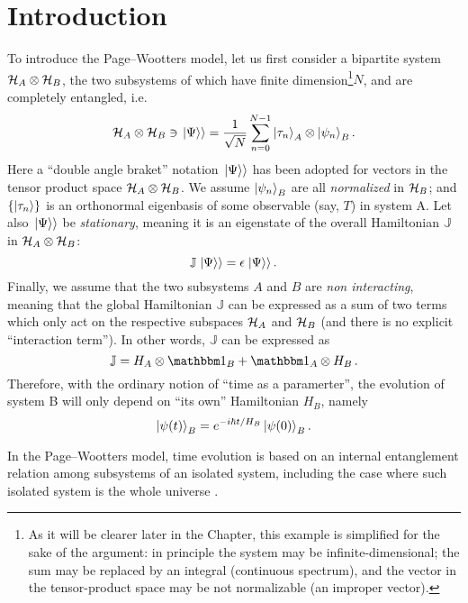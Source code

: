 \section{Introduction}

To introduce the Page--Wootters model, let us first consider
a bipartite system $\mathcal{H}_A \otimes \mathcal{H}_B$,
the two subsystems of which have finite dimension\footnote{
  As it will be clearer later in the Chapter,
  this example is simplified for the sake of the argument: in principle
  the system may be infinite-dimensional;
  the sum may be replaced by an integral (continuous spectrum),
  and the vector in the tensor-product space may be not normalizable (an improper vector).
}$N$,
and are completely
entangled, i.e.
\begin{equation}\label{eq:pw:finite-entanglement}
  \mathcal{H}_A \otimes \mathcal{H}_B \ni \left.\left| \Psi \right\rangle\right\rangle
  =
  \frac{1}{\sqrt{N}} \sum_{n=0}^{N-1} \ket{\tau_{n}}_{A} \otimes \ket{\psi_{n}}_{B} \text{.}
\end{equation}
Here
a ``double angle braket'' notation $\left.\left| \Psi \right\rangle\right\rangle$ has been adopted
for vectors in the tensor product space $\mathcal{H}_A \otimes \mathcal{H}_B$.
We assume $\ket{\psi_{n}}_{B}$ are all \emph{normalized} in $\mathcal{H}_B$;
and
$\qty{\ket{{\tau}_n}}$ is an orthonormal eigenbasis of some observable (say, $T$) in system A.
Let also $\left.\left| \Psi \right\rangle\right\rangle$ be \emph{stationary}, meaning it is an eigenstate
of the overall Hamiltonian $\mathbb{J}$ in $\mathcal{H}_A \otimes \mathcal{H}_B$:
$$
  \mathbb{J} \left.\left| \Psi \right\rangle\right\rangle = \epsilon \left.\left| \Psi \right\rangle\right\rangle \text{.}
$$
Finally, we assume that the two subsystems $A$ and $B$ are \emph{non interacting},
meaning that the global Hamiltonian $\mathbb{J}$ can be expressed as a sum of two terms
which only act on the respective subspaces $\mathcal{H}_A$ and $\mathcal{H}_B$
(and there is no explicit ``interaction term''). In other words,
$\mathbb{J}$ can be expressed as
$$
  \mathbb{J} = H_A \ox \idop_B + \idop_A \ox H_B \, \text{.} 
$$
Therefore, with the ordinary notion of ``time as a paramerter'',
the evolution of system B will only depend on ``its own'' Hamiltonian $H_B$, namely
\begin{equation}\label{eq:pw:ordinary_B}
  \ket{\psi(t)}_B = e^{- i \hbar t / H_B } \ket{\psi(0)}_B \text{.}  
\end{equation}
 
In the Page--Wootters model, time evolution is based on an internal entanglement
relation among subsystems of an isolated system,
including the case where such isolated system is the whole universe \parencite{PageWootters}.

